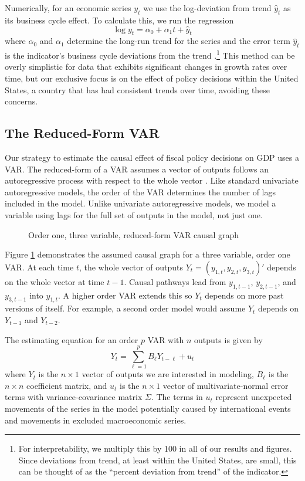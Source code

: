 Numerically, for an economic series $y_t$ we use the log-deviation from trend $\hat{y}_t$ as its business cycle effect. To calculate this, we run the regression
\[
    \log y_t = \alpha_0 + \alpha_1 t + \hat{y}_t
\]
where $\alpha_0$ and $\alpha_1$ determine the long-run trend for the series and the error term $\hat{y}_t$ is the indicator's business cycle deviations from the trend \parencite{seip2024scoring}.\footnote{For interpretability, we multiply this by 100 in all of our results and figures. Since deviations from trend, at least within the United States, are small, this can be thought of as the ``percent deviation from trend'' of the indicator.} This method can be overly simplistic for data that exhibits significant changes in growth rates over time, but our exclusive focus is on the effect of policy decisions within the United States, a country that has had consistent trends over time, avoiding these concerns.


\subsection{The Reduced-Form VAR}

Our strategy to estimate the causal effect of fiscal policy decisions on GDP uses a VAR. The reduced-form of a VAR assumes a vector of outputs follows an autoregressive process with respect to the whole vector \parencite{neusser2016time}. Like standard univariate autoregressive models, the order of the VAR determines the number of lags included in the model. Unlike univariate autoregressive models, we model a variable using lags for the full set of outputs in the model, not just one.

\begin{figure}[t!]
    \centering
    \caption{Order one, three variable, reduced-form VAR causal graph}
    
    \label{fig:rfvar-graph}
\end{figure}

Figure \ref{fig:rfvar-graph} demonstrates the assumed causal graph for a three variable, order one VAR. At each time $t$, the whole vector of outputs $Y_t = (y_{1, t}, y_{2, t}, y_{3, t})'$ depends on the whole vector at time $t-1$. Causal pathways lead from $y_{1, t-1}$, $y_{2, t-1}$, and $y_{3, t-1}$ into $y_{1,t}$. A higher order VAR extends this so $Y_t$ depends on more past versions of itself. For example, a second order model would assume $Y_t$ depends on $Y_{t-1}$ and $Y_{t-2}$.

The estimating equation for an order $p$ VAR with $n$ outputs is given by
\[
    Y_t = \sum_{\ell = 1}^p B_\ell Y_{t - \ell} + u_t
\]
where $Y_t$ is the $n \times 1$ vector of outputs we are interested in modeling, $B_{\ell}$ is the $n \times n$ coefficient matrix, and $u_t$ is the $n \times 1$ vector of multivariate-normal error terms with variance-covariance matrix $\Sigma$. The terms in $u_t$ represent unexpected movements of the series in the model potentially caused by international events and movements in excluded macroeconomic series.



